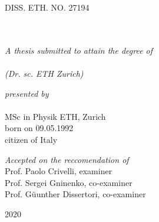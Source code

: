 \AtBeginDocument{
\hypersetup{pdftitle=\ttitle} %
\hypersetup{pdfauthor=\authorname} %
\hypersetup{pdfkeywords=\keywordnames} %
}




\frontmatter %

\pagestyle{plain} %


\begin{titlepage}
\begin{center}

\vspace*{.06\textheight}
{\scshape\LARGE DISS. ETH. NO. 27194}\vspace{1.5cm} %
\\[0.5cm] %

\HRule \\[0.4cm] %
{\huge \bfseries \ttitle\par}\vspace{0.4cm} %
\HRule \\[1.5cm] %


\large \textit{A thesis submitted to attain the degree of \\ \textbf{\degreename}}\\[0.3cm] %
\textit{(Dr. sc. ETH Zurich)}\\[0.4cm]

\vfill

\large \textit{presented by}\\[0.3cm]
\href{}{\authorname}\\[0.2cm] %
MSc in Physik ETH, Zurich\\[1cm]
born on 09.05.1992\\[0.2cm]
citizen of Italy\\[1cm]
 
\vfill

\large \textit{Accepted on the reccomendation of}\\[0.3cm] %
Prof. Paolo Crivelli, examiner\\[0.1cm]
Prof. Sergei Gninenko, co-examiner\\[0.1cm]
Prof. G{\"u}unther Dissertori, co-examiner\\[0.1cm]

\vfill

{\large 2020}\\[4cm] %
 
\vfill
\end{center}
\end{titlepage}


